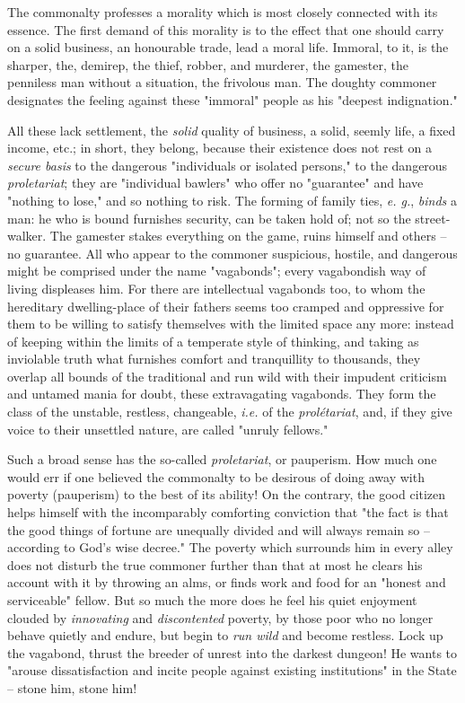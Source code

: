 \documentclass[a4paper]{book}
\begin{document}
The commonalty professes a morality which is most closely connected with its 
essence. The first demand of this morality is to the effect that one should 
carry on a solid business, an honourable trade, lead a moral life. Immoral, to 
it, is the sharper, the, demirep, the thief, robber, and murderer, the 
gamester, the penniless man without a situation, the frivolous man. The 
doughty commoner designates the feeling against these "{}immoral"{} people as 
his "{}deepest indignation."{}

All these lack settlement, the \textit{solid} quality of business, a solid, 
seemly life, a fixed income, etc.; in short, they belong, because their 
existence does not rest on a \textit{secure basis} to the dangerous 
"{}individuals or isolated persons,"{} to the dangerous \textit{proletariat}; 
they are "{}individual bawlers"{} who offer no "{}guarantee"{} and have 
"{}nothing to lose,"{} and so nothing to risk. The forming of family ties, 
\textit{e. g.}, \textit{binds} a man: he who is bound furnishes security, can 
be taken hold of; not so the street-walker. The gamester stakes everything on 
the game, ruins himself and others -- no guarantee. All who appear to the 
commoner suspicious, hostile, and dangerous might be comprised under the name 
"{}vagabonds"{}; every vagabondish way of living displeases him. For there are 
intellectual vagabonds too, to whom the hereditary dwelling-place of their 
fathers seems too cramped and oppressive for them to be willing to satisfy 
themselves with the limited space any more: instead of keeping within the 
limits of a temperate style of thinking, and taking as inviolable truth what 
furnishes comfort and tranquillity to thousands, they overlap all bounds of 
the traditional and run wild with their impudent criticism and untamed mania 
for doubt, these extravagating vagabonds. They form the class of the unstable, 
restless, changeable, \textit{i.e.} of the \textit{prol\'etariat}, and, if 
they give voice to their unsettled nature, are called "{}unruly fellows."{}

Such a broad sense has the so-called \textit{proletariat}, or pauperism. How 
much one would err if one believed the commonalty to be desirous of doing away 
with poverty (pauperism) to the best of its ability! On the contrary, the good 
citizen helps himself with the incomparably comforting conviction that "{}the 
fact is that the good things of fortune are unequally divided and will always 
remain so -- according to God's wise decree."{} The poverty which surrounds 
him in every alley does not disturb the true commoner further than that at 
most he clears his account with it by throwing an alms, or finds work and food 
for an "{}honest and serviceable"{} fellow. But so much the more does he feel 
his quiet enjoyment clouded by \textit{innovating} and \textit{discontented} 
poverty, by those poor who no longer behave quietly and endure, but begin to 
\textit{run wild} and become restless. Lock up the vagabond, thrust the 
breeder of unrest into the darkest dungeon! He wants to "{}arouse 
dissatisfaction and incite people against existing institutions"{} in the 
State -- stone him, stone him!
\end{document}
